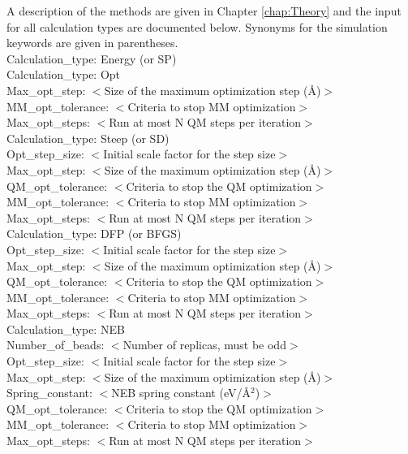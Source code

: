 \documentclass[12pt]{report}
\begin{document}
A description of the methods are given in Chapter \ref{chap:Theory} and the
input for all calculation types are documented below.
Synonyms for the simulation keywords are given in parentheses. \\

Calculation\_type: Energy (or SP) \\

Calculation\_type: Opt \\
Max\_opt\_step: $<$Size of the maximum optimization step (\AA)$>$ \\
MM\_opt\_tolerance: $<$Criteria to stop MM optimization$>$ \\
Max\_opt\_steps: $<$Run at most N QM steps per iteration$>$ \\

Calculation\_type: Steep (or SD) \\
Opt\_step\_size: $<$Initial scale factor for the step size$>$ \\
Max\_opt\_step: $<$Size of the maximum optimization step (\AA)$>$ \\
QM\_opt\_tolerance: $<$Criteria to stop the QM optimization$>$ \\
MM\_opt\_tolerance: $<$Criteria to stop MM optimization$>$ \\
Max\_opt\_steps: $<$Run at most N QM steps per iteration$>$ \\

Calculation\_type: DFP (or BFGS) \\
Opt\_step\_size: $<$Initial scale factor for the step size$>$ \\
Max\_opt\_step: $<$Size of the maximum optimization step (\AA)$>$ \\
QM\_opt\_tolerance: $<$Criteria to stop the QM optimization$>$ \\
MM\_opt\_tolerance: $<$Criteria to stop MM optimization$>$ \\
Max\_opt\_steps: $<$Run at most N QM steps per iteration$>$ \\

Calculation\_type: NEB \\
Number\_of\_beads: $<$Number of replicas, must be odd$>$ \\
Opt\_step\_size: $<$Initial scale factor for the step size$>$ \\
Max\_opt\_step: $<$Size of the maximum optimization step (\AA)$>$ \\
Spring\_constant: $<$NEB spring constant (eV/\AA$^2$)$>$ \\
QM\_opt\_tolerance: $<$Criteria to stop the QM optimization$>$ \\
MM\_opt\_tolerance: $<$Criteria to stop MM optimization$>$ \\
Max\_opt\_steps: $<$Run at most N QM steps per iteration$>$ \\
\end{document}
